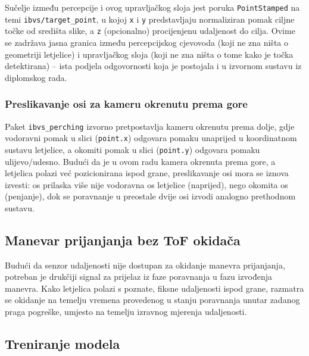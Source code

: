 Sučelje između percepcije i ovog upravljačkog sloja jest poruka \texttt{PointStamped} na temi \texttt{ibvs/target\_point}, u kojoj \texttt{x} i \texttt{y} predstavljaju normaliziran pomak ciljne točke od središta slike, a \texttt{z} (opcionalno) procijenjenu udaljenost do cilja. Ovime se zadržava jasna granica između percepcijskog cjevovoda (koji ne zna ništa o geometriji letjelice) i upravljačkog sloja (koji ne zna ništa o tome kako je točka detektirana) -- ista podjela odgovornosti koja je postojala i u izvornom sustavu iz diplomskog rada.

\subsubsection{Preslikavanje osi za kameru okrenutu prema gore}
\label{subsec:preslikavanje-osi}


Paket \texttt{ibvs\_perching} izvorno pretpostavlja kameru okrenutu prema dolje, gdje vodoravni pomak u slici (\texttt{point.x}) odgovara pomaku unaprijed u koordinatnom sustavu letjelice, a okomiti pomak u slici (\texttt{point.y}) odgovara pomaku ulijevo/udesno. Budući da je u ovom radu kamera okrenuta prema gore, a letjelica polazi već pozicionirana ispod grane, preslikavanje osi mora se iznova izvesti: os prilaska više nije vodoravna os letjelice (naprijed), nego okomita os (penjanje), dok se poravnanje u preostale dvije osi izvodi analogno prethodnom sustavu.

\subsection{Manevar prijanjanja bez ToF okidača}
\label{subsec:prijanjanje}


Budući da senzor udaljenosti nije dostupan za okidanje manevra prijanjanja, potreban je drukčiji signal za prijelaz iz faze poravnanja u fazu izvođenja manevra. Kako letjelica polazi s poznate, fiksne udaljenosti ispod grane, razmatra se okidanje na temelju vremena provedenog u stanju poravnanja unutar zadanog praga pogreške, umjesto na temelju izravnog mjerenja udaljenosti.

\subsection{Treniranje modela}
\label{subsec:treniranje-modela}

